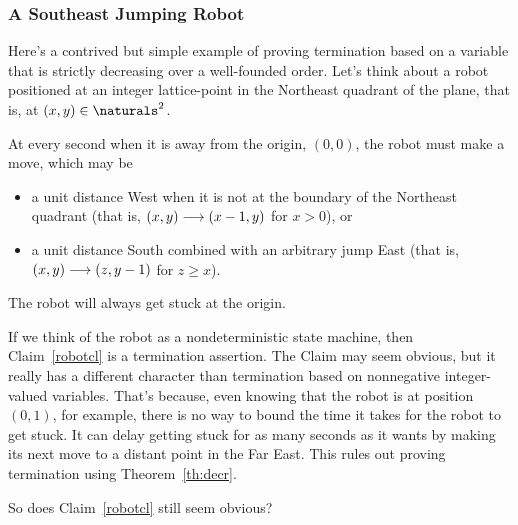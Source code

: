 \subsubsection{A Southeast Jumping Robot}

Here's a contrived but simple example of proving termination based on a
variable that is strictly decreasing over a well-founded order.  Let's
think about a robot positioned at an integer lattice-point in the
Northeast quadrant of the plane, that is, at $(x,y) \in \naturals^2$.

At every second when it is away from the origin, $(0,0)$, the robot must
make a move, which may be
\begin{itemize}

\item a unit distance West when it is not at the boundary of the Northeast
  quadrant (that is, $(x,y) \mathrel{\longrightarrow} (x-1,y)$ for $x>0$), or

\item a unit distance South combined with an arbitrary jump East (that is,
     $(x,y) \mathrel{\longrightarrow} (z,y-1)$ for $z\geq x$).

\end{itemize}
\begin{claim}\label{robotcl}
The robot will always get stuck at the origin.
\end{claim}

If we think of the robot as a nondeterministic state machine, then
Claim~\ref{robotcl} is a termination assertion.  The Claim may seem
obvious, but it really has a different character than termination based on
nonnegative integer-valued variables.  That's because, even knowing that
the robot is at position $(0,1)$, for example, there is no way to bound
the time it takes for the robot to get stuck.  It can delay getting stuck
for as many seconds as it wants by making its next move to a distant point
in the Far East.  This rules out proving termination using
Theorem~\ref{th:decr}.

So does Claim~\ref{robotcl} still seem obvious?

